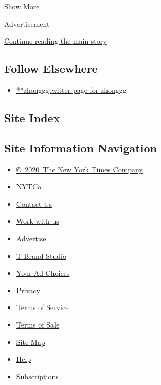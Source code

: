 Show More

Advertisement

\protect\hyperlink{after-mid2}{Continue reading the main story}

\hypertarget{follow-elsewhere}{%
\subsection{Follow Elsewhere}\label{follow-elsewhere}}

\begin{itemize}
\tightlist
\item
  \href{https://twitter.com/zhonggg}{**zhongggtwitter page for zhonggg}
\end{itemize}

\hypertarget{site-index}{%
\subsection{Site Index}\label{site-index}}

\hypertarget{site-information-navigation}{%
\subsection{Site Information
Navigation}\label{site-information-navigation}}

\begin{itemize}
\tightlist
\item
  \href{https://help.nytimes.com/hc/en-us/articles/115014792127-Copyright-notice}{©~2020~The
  New York Times Company}
\end{itemize}

\begin{itemize}
\tightlist
\item
  \href{https://www.nytco.com/}{NYTCo}
\item
  \href{https://help.nytimes.com/hc/en-us/articles/115015385887-Contact-Us}{Contact
  Us}
\item
  \href{https://www.nytco.com/careers/}{Work with us}
\item
  \href{https://nytmediakit.com/}{Advertise}
\item
  \href{http://www.tbrandstudio.com/}{T Brand Studio}
\item
  \href{https://www.nytimes.com/privacy/cookie-policy\#how-do-i-manage-trackers}{Your
  Ad Choices}
\item
  \href{https://www.nytimes.com/privacy}{Privacy}
\item
  \href{https://help.nytimes.com/hc/en-us/articles/115014893428-Terms-of-service}{Terms
  of Service}
\item
  \href{https://help.nytimes.com/hc/en-us/articles/115014893968-Terms-of-sale}{Terms
  of Sale}
\item
  \href{https://spiderbites.nytimes.com}{Site Map}
\item
  \href{https://help.nytimes.com/hc/en-us}{Help}
\item
  \href{https://www.nytimes.com/subscription?campaignId=37WXW}{Subscriptions}
\end{itemize}
